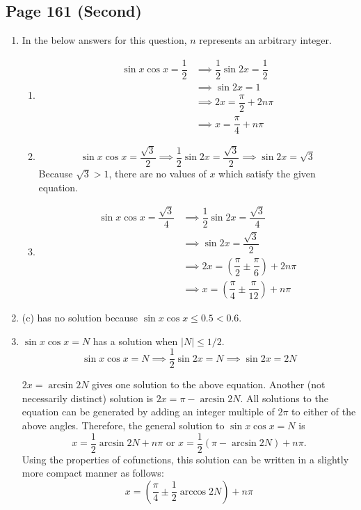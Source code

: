 \documentclass{article}
\newenvironment{solutions}[1]
{\subsection*{#1}
 \begin{enumerate}[leftmargin=1.5em]}
{\end{enumerate}}
\newcommand{\solution}{\item}
\newenvironment{subsolutions}
{\begin{enumerate}}
{\end{enumerate}}
\newcommand{\subsolution}{\item}
\begin{document}
\begin{solutions}{Page 161 (Second)}
\solution %
In the below answers for this question, $n$ represents an arbitrary integer.
\begin{subsolutions}
\subsolution %
\begin{align*}
\sin{x}\cos{x} = \dfrac{1}{2} &\implies \dfrac{1}{2}\sin{2x} = \dfrac{1}{2} \\
&\implies \sin{2x} = 1 \\
&\implies 2x = \dfrac{\pi}{2} + 2n\pi \\
&\implies x = \dfrac{\pi}{4} + n\pi
\end{align*}

\subsolution %
\[
\sin{x}\cos{x} = \dfrac{\sqrt{3}}{2} \implies \dfrac{1}{2}\sin{2x} = \dfrac{\sqrt{3}}{2} \implies \sin{2x} = \sqrt{3}
\]
Because $\sqrt{3} > 1$, there are no values of $x$ which satisfy the given equation.

\subsolution %
\begin{align*}
\sin{x}\cos{x} = \dfrac{\sqrt{3}}{4} &\implies \dfrac{1}{2}\sin{2x} = \dfrac{\sqrt{3}}{4} \\
&\implies \sin{2x} = \dfrac{\sqrt{3}}{2} \\
&\implies 2x = \left(\dfrac{\pi}{2} \pm \dfrac{\pi}{6}\right) + 2n\pi \\
& \implies x = \left(\dfrac{\pi}{4} \pm \dfrac{\pi}{12}\right) + n\pi
\end{align*}

\end{subsolutions}

\solution %
(c) has no solution because $\sin{x}\cos{x} \leq 0.5 < 0.6$.

\solution %
$\sin{x}\cos{x}=N$ has a solution when $\left\lvert N \right\rvert \leq 1/2$.
\[
\sin{x}\cos{x} = N \implies \dfrac{1}{2}\sin{2x} = N
\implies \sin{2x} = 2N
\]

$2x = \arcsin{2N}$ gives one solution to the above equation. Another (not necessarily distinct) solution is $2x = \pi - \arcsin{2N}$. All solutions to the equation can be generated by adding an integer multiple of $2\pi$ to either of the above angles. Therefore, the general solution to $\sin{x}\cos{x}=N$ is
\[
x = \dfrac{1}{2} \arcsin{2N} + n\pi \text{ or } x = \dfrac{1}{2}\left(\pi-\arcsin{2N}\right) + n\pi.
\]
Using the properties of cofunctions, this solution can be written in a slightly more compact manner as follows:
\[
x = \left(\dfrac{\pi}{4} \pm \dfrac{1}{2}\arccos{2N}\right) + n\pi
\]
\end{solutions}
\end{document}
